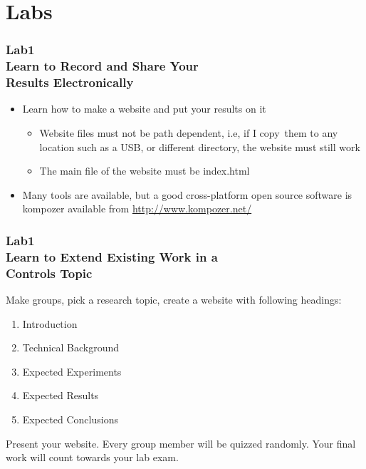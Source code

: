 \documentclass[hyperref={pdfpagelabels=true}]{beamer}
\begin{document}
\section{Labs}

\begin{frame}
\frametitle{Lab1 \\{\large Learn to Record and Share Your \\ Results Electronically}}
\begin{itemize}
\item Learn how to make a website and put your results on it
\begin{itemize}
\item Website files must not be path dependent, i.e, if I copy\
them to any location such as a USB, or different directory,
the website must still work
\item The main file of the website must be index.html
\end{itemize}
\item Many tools are available, but a good cross-platform open source
software is kompozer available from \url{http://www.kompozer.net/}
\end{itemize}
\end{frame}









\begin{frame}
\frametitle{Lab1 \\{\large Learn to Extend Existing Work in a \\ Controls Topic}}
Make groups, pick a research topic, create a website with following
headings:
\begin{enumerate}
\item Introduction
\item Technical Background
\item Expected Experiments
\item Expected Results
\item Expected Conclusions
\end{enumerate}
Present your website. Every group member will be quizzed randomly.
Your final work will count towards your lab exam.
\end{frame}
\end{document}
